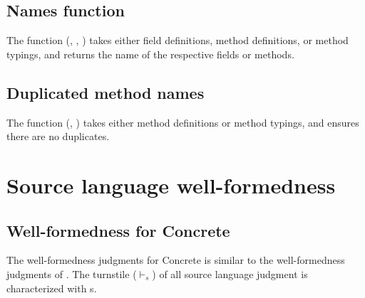 \documentclass[a4paper,USenglish]{tex/lipics-v2016}
\begin{document}
\begin{mathpar}

\end{mathpar}

\subsection{Names function}

The  function (, , ) takes either field definitions, method definitions, or 
method typings, and returns the name of the respective fields or methods.

\subsection{Duplicated method names}

The  function (, ) takes either
method definitions or method typings, and ensures there are no duplicates.


\section{Source language well-formedness}

\subsection*{Well-formedness for Concrete}

The well-formedness judgments for Concrete is similar to the well-formedness
judgments of \kafka. The turnstile ($\vdash_{\!s}$) of all source language judgment is
characterized with s.
\end{document}
